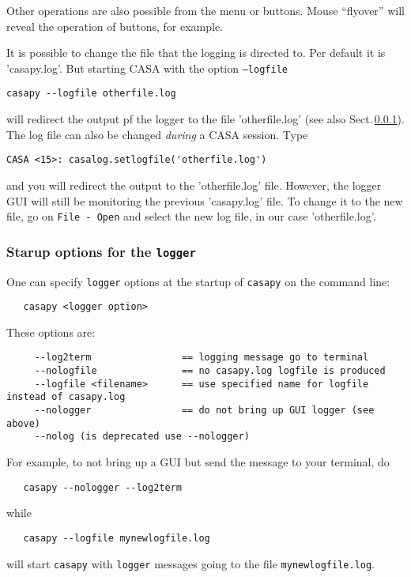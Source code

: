 Other operations are also possible from the menu or buttons.  Mouse
``flyover'' will reveal the operation of buttons, for example.

It is possible to change the file that the logging is directed to. Per
default it is 'casapy.log'. But starting CASA with the option {\tt --logfile} 

\small
\begin{verbatim}
casapy --logfile otherfile.log
\end{verbatim}
\normalsize 

will redirect the output pf the logger to the file 'otherfile.log'
(see also Sect.\,\ref{section:intro.common.logger.startup}).
The log file can also be changed {\it during} a CASA session. Type 
\small
\begin{verbatim}
CASA <15>: casalog.setlogfile('otherfile.log')
\end{verbatim}
\normalsize 

and you will redirect the output to the 'otherfile.log' file.
However, the logger GUI will still be monitoring the previous
'casapy.log' file. To change it to the new file, go on {\tt File -
 Open} and select the new log file, in our case 'otherfile.log'.

\subsubsection{Starup options for the {\tt logger}}
\label{section:intro.common.logger.startup}

One can specify {\tt logger} options at the startup of {\tt casapy} on
the command line:
\small
\begin{verbatim}
   casapy <logger option>
\end{verbatim}
\normalsize

These options are:
\small
\begin{verbatim}
     --log2term                == logging message go to terminal
     --nologfile               == no casapy.log logfile is produced
     --logfile <filename>      == use specified name for logfile instead of casapy.log
     --nologger                == do not bring up GUI logger (see above)
     --nolog (is deprecated use --nologger)
\end{verbatim}
\normalsize
For example, to not bring up a GUI but send the message to your
terminal, do
\small
\begin{verbatim}
   casapy --nologger --log2term
\end{verbatim}
\normalsize
while
\small
\begin{verbatim}
   casapy --logfile mynewlogfile.log
\end{verbatim}
\normalsize
will start {\tt casapy} with {\tt logger} messages going to the file
{\tt mynewlogfile.log}.

